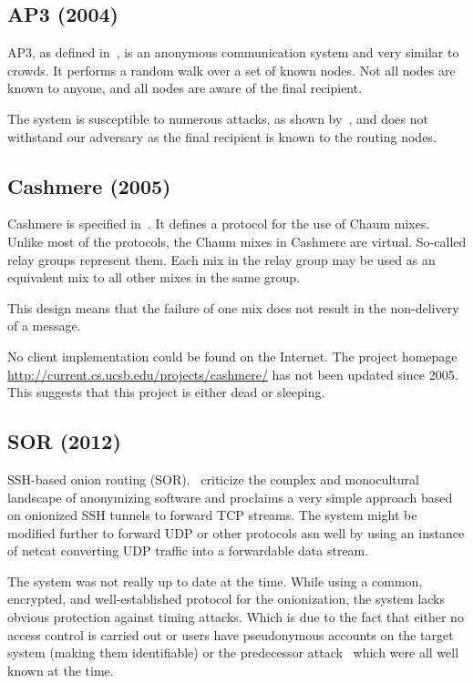 \subsection{AP3 (2004)}
AP3, as defined in~\cite{mislove2004ap3}, is an anonymous communication system and very similar to crowds. It performs a random walk over a set of known nodes. Not all nodes are known to anyone, and all nodes are aware of the final recipient. 

The system is susceptible to numerous attacks, as shown by~\cite{ccs2008:mittal}, and does not withstand our adversary as the final recipient is known to the routing nodes. 

\subsection{Cashmere (2005)}
Cashmere is specified in~\cite{zhuang2005cashmere}. It defines a protocol for the use of Chaum mixes. Unlike most of the protocols, the Chaum mixes in Cashmere are virtual. So-called relay groups represent them. Each mix in the relay group may be used as an equivalent mix to all other mixes in the same group. 

This design means that the failure of one mix does not result in the non-delivery of a message.

No client implementation could be found on the Internet. The project homepage \href{http://current.cs.ucsb.edu/projects/cashmere/}{http://current.cs.ucsb.edu/projects/cashmere/} has not been updated since 2005. This suggests that this project is either dead or sleeping.

\subsection{SOR (2012)}
SSH-based onion routing (SOR).~\cite{Egners_2012} criticize
the complex and monocultural landscape of anonymizing software and proclaims a very simple approach based on onionized SSH tunnels to forward TCP streams. The system might be modified further to forward UDP or other protocols asn well by using an instance of netcat converting UDP traffic into a forwardable data stream.

The system was not really up to date at the time. While using a common, encrypted, and well-established protocol for the onionization, the system lacks obvious protection against timing attacks. Which is due to the fact that either no access control is carried out or users have pseudonymous accounts on the target system (making them identifiable) or the predecessor attack~\cite{wright2004predecessor} which were all well known at the time.

